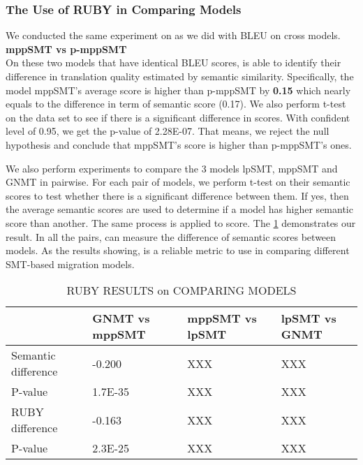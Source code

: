 \subsubsection{The Use of RUBY in Comparing Models}
We conducted the same experiment on {\model} as we did with BLEU on cross models. \\ 
\textbf{mppSMT vs p-mppSMT}\\
On these two models that have identical BLEU scores, {\model} is able to identify their difference in translation quality estimated by semantic similarity. Specifically, the model mppSMT's average {\model} score is higher than p-mppSMT by \textbf{0.15} which nearly equals to the difference in term of semantic score (0.17). We also perform t-test on the data set to see if there is a significant difference in {\model} scores. With confident level of 0.95, we get the p-value of 2.28E-07. That means, we reject the null hypothesis and conclude that mppSMT's {\model} score is higher than p-mppSMT's ones.

We also perform experiments to compare the 3 models lpSMT, mppSMT and GNMT in pairwise. For each pair of models, we perform t-test on their semantic scores to test whether there is a significant difference between them. If yes, then the average semantic scores are used to determine if a model has higher semantic score than another. The same process is applied to {\model} score. The \ref{table:rubyCross} demonstrates our result. In all the pairs, {\model} can measure the difference of semantic scores between models. 
As the results showing, {\model} is a reliable metric to use in comparing different SMT-based migration models. 	

\begin{table}
\centering
\caption{RUBY RESULTS on COMPARING MODELS}
\begin{tabular}{|p{2.3cm}|p{1.4cm}|p{1.4cm}|p{1.4cm}|}
\hline
 & GNMT vs mppSMT & mppSMT vs lpSMT & lpSMT vs GNMT\\
\hline
Semantic difference & -0.200 & XXX & XXX \\
\hline
P-value  & 1.7E-35 & XXX & XXX \\
\hline
RUBY difference & -0.163 & XXX & XXX \\
\hline
P-value & 2.3E-25 & XXX & XXX \\
\hline
\end{tabular}
\label{table:rubyCross}
\end{table}